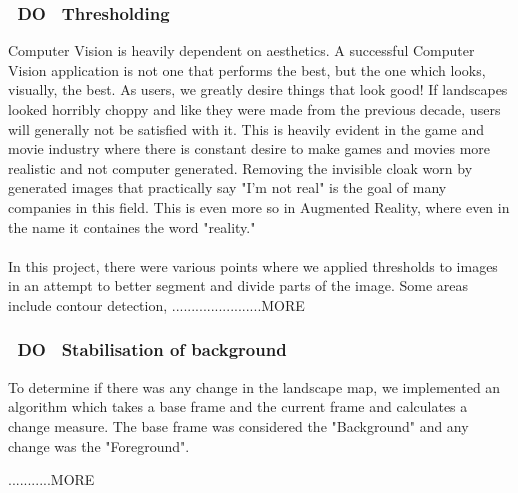 \documentclass[11pt]{article}
\begin{document}
\subsubsection{~DO~ Thresholding}
Computer Vision is heavily dependent on aesthetics. A successful Computer
Vision application is not one that performs the best, but the one which looks,
visually, the best. As users, we greatly desire things that look good! If
landscapes looked horribly choppy and like they were made from the previous 
decade, users will generally not be satisfied with it. This is heavily evident
in the game and movie industry where there is constant desire to make games
and movies more realistic and not computer generated. Removing the invisible 
cloak worn by generated images that practically say "I'm not real" is the
goal of many companies in this field. This is even more so in  Augmented Reality,
where even in the name it containes the word "reality." \\
\\
In this project, there were various points where we applied thresholds to images
in an attempt to better segment and divide parts of the image. Some areas include
contour detection, 
.......................MORE

\subsubsection{~DO~ Stabilisation of background}
To determine if there was any change in the landscape map, we implemented an
algorithm which takes a base frame and the current frame and calculates a change
measure. The base frame was considered the "Background" and any change was the
"Foreground". 

...........MORE

\newpage



\end{document}
